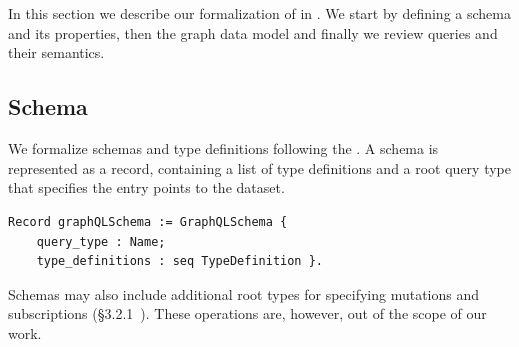 \section{\gcoql}\label{sec:form}

In this section we describe our formalization of \gql in \coq. We start by defining a schema and its properties, then the graph data model and finally we review queries and their semantics. %


\subsection{Schema}\label{subsec:schema}
We formalize schemas and type definitions following the \spec. A
schema is represented as a record, containing a list of type
definitions and a root query type that specifies the entry points to the
dataset. %
%

\begin{verbatim}
Record graphQLSchema := GraphQLSchema {
    query_type : Name;
    type_definitions : seq TypeDefinition }.
\end{verbatim}
%
Schemas may also include additional root types for specifying mutations and subscriptions (\cf\S3.2.1~\cite{gqlspec}). These operations are, however, out of the scope of our work.

